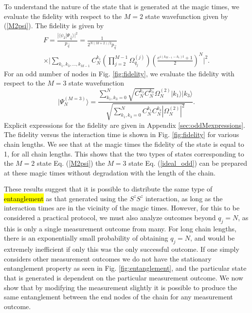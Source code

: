 \documentclass{WileyMSP-template}
\begin{document}
To understand the nature of the state that is generated at the magic times,  we evaluate the fidelity with respect to the $ M = 2$ state wavefunction given by (\ref{M2psi}). The fidelity is given by
%
\begin{multline}
F = \frac{| \langle  \psi_2 | \Psi_{\vec{q}} \rangle |^2}{p_{\vec{q}}}  = \frac{1}{2^{N(M+2)/2} p_{\vec{q}} } \\
\times \Big| \sum_{k_1, k_3, \dots, k_{M-1} }C_N^{k_1}
\left( \prod_{j=2}^{M-1} \Omega_{q_j}^{(j)} \right) \left(\frac{e^{i(k_{M-1} - k_1)t }+1}{2}\right)^N \Big|^2 .
\label{fideven}
\end{multline}
%
For an odd number of nodes in Fig. \ref{fig:fidelity}, we evaluate the fidelity with respect to the $ M = 3$ state wavefunction
%
\begin{equation}
    \label{ideal_odd}
| \Psi_N^{(M=3)}  \rangle=\frac{\sum_{k_1,k_3=0}^{N} \sqrt{ C^{k_1}_{N}  C^{k_3}_{N} }
 \Omega_{N}^{(2)}  |k_1\rangle|k_3\rangle }{\sqrt{\sum_{k_1,k_3=0}^{N}  C^{k_1}_{N}  C^{k_3}_{N} | \Omega_{N}^{(2)} |^2 } } .
\end{equation}
%
Explicit expressions for the fidelity are given in Appendix \ref{sec:oddMexpressions}.  The fidelity versus the interaction time is shown in Fig. \ref{fig:fidelity} for various chain lengths. We see that at the magic times the fidelity of the state is equal to 1, for all chain lengths.  This shows that the two types of states corresponding to the $ M = 2 $ state Eq. (\ref{M2psi}) the $ M = 3 $ state Eq. (\ref{ideal_odd}) can be prepared at these magic times without degradation with the length of the chain.

These results suggest that it is possible to distribute the same type of  \hl{entanglement} as that generated using the $ S^z S^z $ interaction, as long as the interaction times are in the vicinity of the magic times.  However, for this to be considered a practical protocol, we must also analyze outcomes beyond $ q_j = N $, as this is only a single measurement outcome from many.
For long chain lengths, there is an exponentially small probability of obtaining $ q_j = N $, and  would be extremely inefficient if only this was the only successful outcome.  If one simply considers other measurement outcomes we do not have the stationary entanglement property as seen in Fig. \ref{fig:entanglement}, and the particular state that is generated is dependent on the particular measurement outcome.  We now show that by modifying the measurement slightly it is possible to produce the same entanglement between the end nodes of the chain for any measurement outcome.
\end{document}
